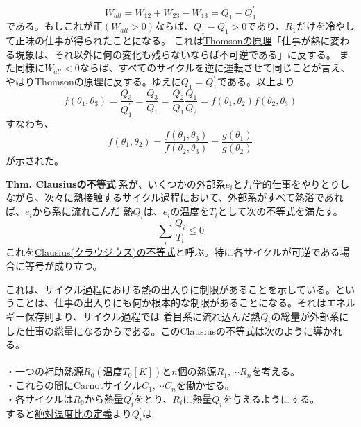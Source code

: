 \documentclass{jsarticle}
\begin{document}
\begin{equation*}
    W_{all}=W_{12}+W_{23}-W_{13}=Q_{1}-Q_{1}^{\prime}
\end{equation*}
である。もしこれが正\((W_{all}>0)\)ならば、\(Q_{1}-Q_{1}^{\prime}>0\)であり、\(R_{1}\)だけを冷やして正味の仕事が得られたことになる。
これは\hyperlink{Thomsonの原理}{Thomsonの原理}「仕事が熱に変わる現象は、それ以外に何の変化も残らないならば不可逆である」に反する。
また同様に\(W_{all}<0\)ならば、すべてのサイクルを逆に運転させて同じことが言え、やはりThomsonの原理に反する。ゆえに\(Q_{1}=Q_{1}^{\prime}\)である。以上より
\begin{equation*}
    f(\theta_{1},\theta_{3})=\frac{Q_{3}}{Q_{1}^{\prime}}=\frac{Q_{3}}{Q_{1}}=\frac{Q_{2}}{Q_{1}}\frac{Q_{1}}{Q_{2}}=f(\theta_{1},\theta_{2})f(\theta_{2},\theta_{3})
\end{equation*}
すなわち、
\begin{equation*}
    f(\theta_{1},\theta_{2})=\frac{f(\theta_{1},\theta_{3})}{f(\theta_{2},\theta_{3})}=\frac{g(\theta_{1})}{g(\theta_{2})}
\end{equation*}
が示された。\\
\begin{itembox}[l]{\textbf{Thm. Clausiusの不等式}}
    系が、いくつかの外部系\(e_{i}\)と力学的仕事をやりとりしながら、次々に熱接触するサイクル過程において、外部系がすべて熱浴であれば、\(e_{i}\)から系に流れこんだ
    熱\(Q_{i}\)は、\(e_{i}\)の温度を\(T_{i}\)として次の不等式を満たす。
    \begin{equation*}
        \sum_{i}\frac{Q_{i}}{T_{i}}\leq0
    \end{equation*}
    これを\underline{Clausius(クラウジウス)の不等式}と呼ぶ。特に各サイクルが可逆である場合に等号が成り立つ。
\end{itembox}
これは、サイクル過程における熱の出入りに制限があることを示している。ということは、仕事の出入りにも何か根本的な制限があることになる。それはエネルギー保存則より、サイクル過程では
着目系に流れ込んだ熱\(Q_{i}\)の総量が外部系にした仕事の総量になるからである。このClausiusの不等式は次のように導かれる。\\
\\
・一つの補助熱源\(R_{0}(温度T_{0}[K])\)と\(n\)個の熱源\(R_{1},\cdots R_{n}\)を考える。\\
・これらの間にCarnotサイクル\(C_{1},\cdots C_{n}\)を働かせる。\\
・各サイクルは\(R_{0}\)から熱量\(Q_{i}^{\prime}\)をとり、\(R_{i}\)に熱量\(Q_{i}\)を与えるようにする。\\
すると\hyperlink{絶対温度}{絶対温度比の定義}より\(Q_{i}^{\prime}\)は
\end{document}
